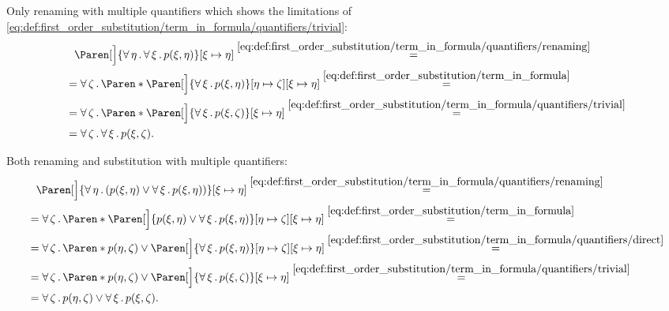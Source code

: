 \begin{example}
\begin{ExEnum}
     Only renaming with multiple quantifiers which shows the limitations of \eqref{eq:def:first_order_substitution/term_in_formula/quantifiers/trivial}:
    \begin{align*}
      &{}\phantom{=}{}
      \Paren[\Big]{\ForAll{\eta} \ForAll{\xi} p(\xi, \eta)}[\xi \mapsto \eta]
      \overset {\eqref{eq:def:first_order_substitution/term_in_formula/quantifiers/renaming}} = \\ &=
      \ForAll{\zeta} \Paren*{ \Paren[\Big]{ \ForAll{\xi} p(\xi, \eta) }[\eta \mapsto \zeta][\xi \mapsto \eta]}
      \overset {\eqref{eq:def:first_order_substitution/term_in_formula}} = \\ &=
      \ForAll{\zeta} \Paren*{ \Paren[\Big]{ \ForAll{\xi} p(\xi, \zeta) }[\xi \mapsto \eta]}
      \overset {\eqref{eq:def:first_order_substitution/term_in_formula/quantifiers/trivial}} = \\ &=
      \ForAll{\zeta} \ForAll{\xi} p(\xi, \zeta).
    \end{align*}

     Both renaming and substitution with multiple quantifiers:
    \begin{align*}
      &{}\phantom{=}{}
      \Paren[\Big]{ \ForAll{\eta} (p(\xi, \eta) \vee \ForAll{\xi} p(\xi, \eta)) }[\xi \mapsto \eta]
      \overset {\eqref{eq:def:first_order_substitution/term_in_formula/quantifiers/renaming}} = \\ &=
      \ForAll{\zeta} \Paren*{ \Paren[\Big]{ p(\xi, \eta) \vee \ForAll{\xi} p(\xi, \eta) }[\eta \mapsto \zeta][\xi \mapsto \eta] }
      \overset {\eqref{eq:def:first_order_substitution/term_in_formula}} = \\ &=
      \ForAll{\zeta} \Paren*{ p(\eta, \zeta) \vee \Paren[\Big]{ \ForAll{\xi} p(\xi, \eta) }[\eta \mapsto \zeta][\xi \mapsto \eta] }
      \overset {\eqref{eq:def:first_order_substitution/term_in_formula/quantifiers/direct}} = \\ &=
      \ForAll{\zeta} \Paren*{ p(\eta, \zeta) \vee \Paren[\Big]{ \ForAll{\xi} p(\xi, \zeta) }[\xi \mapsto \eta] }
      \overset {\eqref{eq:def:first_order_substitution/term_in_formula/quantifiers/trivial}} = \\ &=
      \ForAll{\zeta} p(\eta, \zeta) \vee \ForAll{\xi} p(\xi, \zeta).
    \end{align*}


\end{ExEnum}
\end{example}
